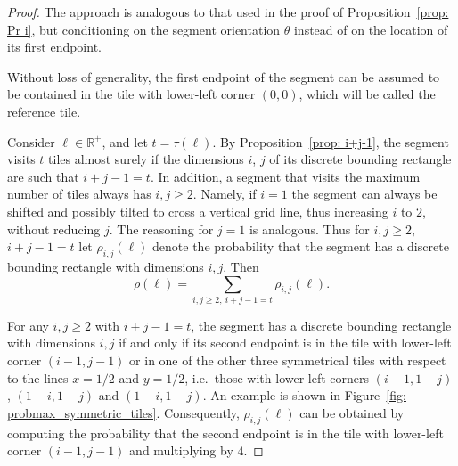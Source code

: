 \documentclass[12pt, a4paper]{article}
\newcommand{\funt}{\tau} %
\newcommand{\probmax}{\rho} %
\newcommand{\len}{\ell} %
\newcommand{\tiles}{t} %
\begin{document}
\begin{proof}
The approach is analogous to that used in the proof of Proposition~\ref{prop: Pr i}, but conditioning on the segment orientation $\theta$ instead of on the location of its first endpoint.


Without loss of generality, the first endpoint of the segment can be assumed to be contained in the tile with lower-left corner $(0,0)$, which will be called the reference tile.

Consider $\len \in \mathbb R^+$, and let $\tiles = \funt(\len)$. By Proposition~\ref{prop: i+j-1}, the segment visits $\tiles$ tiles almost surely if the dimensions $i$, $j$ of its discrete bounding rectangle are such that $i+j-1=\tiles$. In addition, a segment that visits the maximum number of tiles always has $i, j \geq 2$. Namely, if $i=1$ the segment can always be shifted and possibly tilted to cross a vertical grid line, thus increasing $i$ to $2$, without reducing $j$. The reasoning for $j=1$ is analogous. Thus for $i, j \geq 2$, $i+j-1=\tiles$ let $\probmax_{i,j}(\len)$ denote the probability that the segment has a discrete bounding rectangle with dimensions $i, j$. Then
\begin{equation}
\label{eq: probmax len probmax i,j len}
\probmax(\len) =  \sum_{i,j \geq 2,\ i+j-1=\tiles} \probmax_{i,j}(\len).
\end{equation}

For any $i, j \geq 2$ with $i+j-1=\tiles$, the segment has a discrete bounding rectangle with dimensions $i, j$ if and only if its second endpoint is in the tile with lower-left corner $(i-1,j-1)$ or in one of the other three symmetrical tiles with respect to the lines $x=1/2$ and $y=1/2$, i.e.~those with lower-left corners $(i-1,1-j)$, $(1-i,1-j)$ and $(1-i,1-j)$. An example is shown in Figure~\ref{fig: probmax_symmetric_tiles}. Consequently, $\probmax_{i,j}(\len)$ can be obtained by computing the probability that the second endpoint is in the tile with lower-left corner $(i-1,j-1)$ and multiplying by $4$.


\end{proof}
\end{document}
